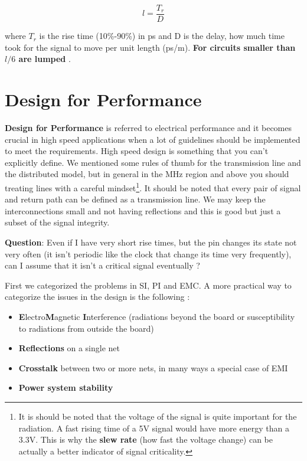 \documentclass[final]{cubedoc}
\begin{document}
	\[l = \frac{T_r}{D}\]
	
	where $T_r$ is the rise time (10\%-90\%) in ps and D is the delay, how much time took for the signal to move per unit length (ps/m).\textbf{ For circuits smaller than $l/6$ are lumped} \cite{johnson2003high}.
	
	
	
	\section{Design for Performance}
	
	\textbf{Design for Performance} is referred to electrical performance and it becomes crucial in high speed applications when a lot of guidelines should be implemented to meet the requirements. 
	High speed design is something that you can't explicitly define. We mentioned some rules of thumb for the transmission line and the distributed model, but in general in the MHz region and above you should treating lines with a careful mindset\footnote{ It is should be noted that the voltage of the signal is quite important for the radiation. A fast rising time of a 5V signal would have more energy than a 3.3V. This is why the \textbf{slew rate} (how fast the voltage change) can be actually a better indicator of signal criticality.}. It should be noted that every pair of signal and return path can be defined as a transmission line. We may keep the interconnections small and not having reflections and this is good but just a subset of the signal integrity.
	
	\textbf{Question}: Even if I have very short rise times, but the pin changes its state not very often (it isn't periodic like the clock that change its time very frequently), can I assume that it isn't a critical signal eventually \cite{instruments1999pcb}?
	
	
	First we categorized the problems in SI, PI and EMC. A more practical way to categorize the issues in the design is the following \cite{brooks2003signal}:
	
	\begin{itemize}
		\item \textbf{E}lectro\textbf{M}agnetic \textbf{I}nterference (radiations beyond the board or susceptibility to radiations from outside the board)
		\item \textbf{Reflections} on a single net
		\item \textbf{Crosstalk} between two or more nets, in many ways a special case of EMI
		\item \textbf{Power system stability} 
	\end{itemize}
	
\end{document}
